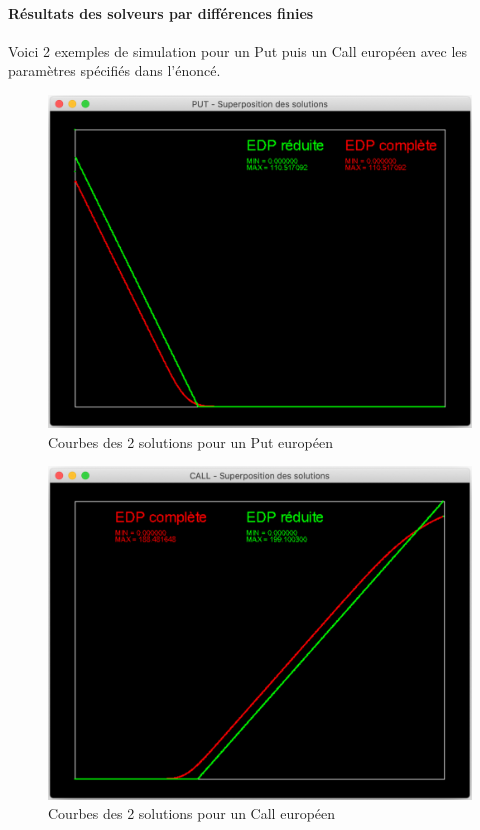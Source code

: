 \documentclass[11pt,a4paper]{article}
\theoremstyle{plain}
\begin{document}
\paragraph{Résultats des solveurs par différences finies} Voici 2 exemples de simulation pour un Put puis un Call européen avec les paramètres spécifiés dans l'énoncé.

\begin{figure}[h]
    \centering
    \includegraphics[scale = 0.27]{img/put_solutions.png}
    \caption{Courbes des 2 solutions pour un Put européen}
\end{figure}

\begin{figure}[h]
    \centering
    \includegraphics[scale = 0.27]{img/call_solutions.png}
    \caption{Courbes des 2 solutions pour un Call européen}
\end{figure}
\end{document}
